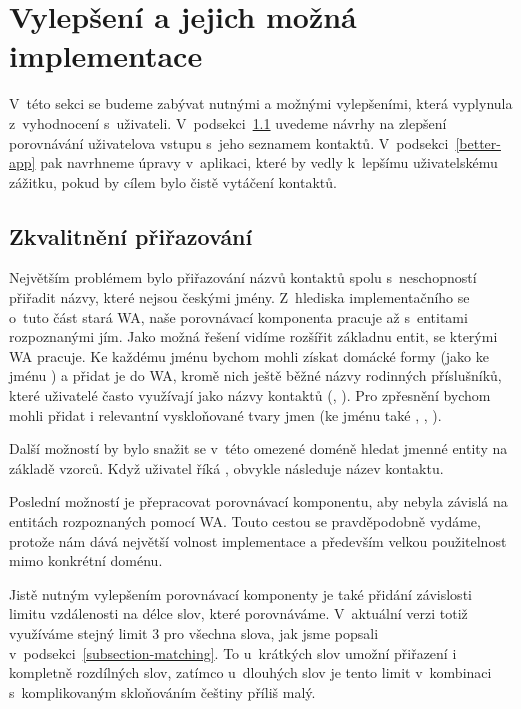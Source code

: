\section{Vylepšení a jejich možná implementace}\label{improvements}

V~této sekci se budeme zabývat nutnými a možnými vylepšeními, která
vyplynula z~vyhodnocení s~uživateli. V~podsekci~\ref{better-match}
uvedeme návrhy na zlepšení porovnávání uživatelova vstupu s~jeho
seznamem kontaktů. V~podsekci~\ref{better-app} pak navrhneme
úpravy v~aplikaci, které by vedly k~lepšímu uživatelskému
zážitku, pokud by cílem bylo čistě vytáčení kontaktů.

\subsection{Zkvalitnění přiřazování}\label{better-match}

Největším problémem bylo přiřazování názvů kontaktů spolu s~neschopností přiřadit
názvy, které nejsou českými jmény. Z~hlediska implementačního se o~tuto část
stará WA, naše porovnávací komponenta pracuje až s~entitami rozpoznanými jím.
Jako možná řešení vidíme rozšířit základnu entit, se kterými WA pracuje. Ke
každému jménu bychom mohli získat domácké formy (jako  ke jménu )
a přidat je do WA, kromě nich ještě běžné názvy rodinných příslušníků,
které uživatelé často využívají jako názvy kontaktů (, ).
Pro zpřesnění bychom mohli přidat i relevantní vyskloňované tvary jmen (ke jménu 
také , , ).

Další možností by bylo snažit se v~této omezené doméně hledat jmenné entity na
základě vzorců. Když uživatel říká , obvykle následuje název
kontaktu.

Poslední možností je přepracovat porovnávací komponentu, aby nebyla závislá
na entitách rozpoznaných pomocí WA. Touto cestou se pravděpodobně vydáme,
protože nám dává největší volnost implementace a především velkou
použitelnost mimo konkrétní doménu.

Jistě nutným vylepšením porovnávací komponenty je také přidání závislosti
limitu vzdálenosti na délce slov, které porovnáváme. V~aktuální verzi
totiž využíváme stejný limit 3 pro všechna slova, jak jsme popsali
v~podsekci~\ref{subsection-matching}. To u~krátkých slov umožní
přiřazení i kompletně rozdílných slov, zatímco u~dlouhých
slov je tento limit v~kombinaci s~komplikovaným skloňováním češtiny
příliš malý.


